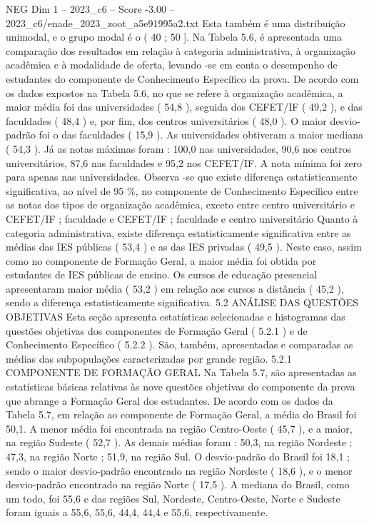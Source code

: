 \begin{textsample}{NEG Dim 1 – 2023\_c6 – Score -3.00 – 2023\_c6/enade\_2023\_zoot\_a5e91995a2.txt}
Esta também é uma distribuição unimodal, e o grupo modal é o ( 40 ; 50 ].
Na Tabela 5.6, é apresentada uma comparação dos resultados em relação à categoria administrativa, à organização acadêmica e à modalidade de oferta, levando -se em conta o desempenho de estudantes do componente de Conhecimento Específico da prova.
De acordo com os dados expostos na Tabela 5.6, no que se refere à organização acadêmica, a maior média foi das universidades ( 54,8 ), seguida dos CEFET/IF ( 49,2 ), e das faculdades ( 48,4 ) e, por fim, dos centros universitários ( 48,0 ).
O maior desvio-padrão foi o das faculdades ( 15,9 ).
As universidades obtiveram a maior mediana ( 54,3 ).
Já as notas máximas foram : 100,0 nas universidades, 90,6 nos centros universitários, 87,6 nas faculdades e 95,2 nos CEFET/IF.
A nota mínima foi zero para apenas nas universidades.
Observa -se que existe diferença estatisticamente significativa, ao nível de 95 \%, no componente de Conhecimento Específico entre as notas dos tipos de organização acadêmica, exceto entre centro universitário e CEFET/IF ; faculdade e CEFET/IF ; faculdade e centro universitário Quanto à categoria administrativa, existe diferença estatisticamente significativa entre as médias das IES públicas ( 53,4 ) e as das IES privadas ( 49,5 ).
Neste caso, assim como no componente de Formação Geral, a maior média foi obtida por estudantes de IES públicas de ensino.
Os cursos de educação presencial apresentaram maior média ( 53,2 ) em relação aos cursos a distância ( 45,2 ), sendo a diferença estatisticamente significativa. 5.2 ANÁLISE DAS QUESTÕES OBJETIVAS Esta seção apresenta estatísticas selecionadas e histogramas das questões objetivas dos componentes de Formação Geral ( 5.2.1 ) e de Conhecimento Específico ( 5.2.2 ).
São, também, apresentadas e comparadas as médias das subpopulações caracterizadas por grande região. 5.2.1 COMPONENTE DE FORMAÇÃO GERAL Na Tabela 5.7, são apresentadas as estatísticas básicas relativas às nove questões objetivas do componente da prova que abrange a Formação Geral dos estudantes.
De acordo com os dados da Tabela 5.7, em relação ao componente de Formação Geral, a média do Brasil foi 50,1.
A menor média foi encontrada na região Centro-Oeste ( 45,7 ), e a maior, na região Sudeste ( 52,7 ).
As demais médias foram : 50,3, na região Nordeste ; 47,3, na região Norte ; 51,9, na região Sul.
O desvio-padrão do Brasil foi 18,1 ; sendo o maior desvio-padrão encontrado na região Nordeste ( 18,6 ), e o menor desvio-padrão encontrado na região Norte ( 17,5 ).
A mediana do Brasil, como um todo, foi 55,6 e das regiões Sul, Nordeste, Centro-Oeste, Norte e Sudeste foram iguais a 55,6, 55,6, 44,4, 44,4 e 55,6, respectivamente.

\end{textsample}
